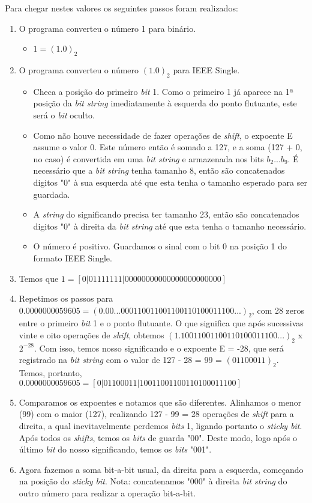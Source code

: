 \documentclass[11pt]{article}
\begin{document}
Para chegar nestes valores os seguintes passos foram realizados:
\begin{enumerate}
  \item O programa converteu o número 1 para binário.
    \begin{itemize}
      \item  $ 1 = (1.0)_2 $
    \end{itemize}
  \item O programa converteu o número $(1.0)_2$ para IEEE Single.
  \begin{itemize}
    \item Checa a posição do primeiro \textit{bit} 1. Como o primeiro 1 já aparece na 1ª posição da \textit{bit string} imediatamente à esquerda do ponto flutuante, este será o \textit{bit} oculto.
    \item Como não houve necessidade de fazer operações de \textit{shift}, o expoente E assume o valor 0. Este número então é somado a 127, e a soma (127 + 0, no caso)
    é convertida em uma \textit{bit string} e armazenada nos bits $b_2 ... b_9$. É necessário que a \textit{bit string} tenha tamanho 8, então são concatenados digitos "0"
    à sua esquerda até que esta tenha o tamanho esperado para ser guardada.
    \item A \textit{string} do significando precisa ter tamanho 23, então são concatenados digitos "0" à direita da \textit{bit string} até que esta tenha
    o tamanho necessário.
    \item O número é positivo. Guardamos o sinal com o bit 0 na posição 1 do formato IEEE Single.
  \end{itemize}
  \item Temos que {\small$1  = [ 0 | 0 1 1 1 1 1 1 1 | 0 0 0 0 0 0 0 0 0 0 0 0 0 0 0 0 0 0 0 0 0 0 0 ] $}
  \item Repetimos os passos para $0.0000000059605 = (0.00...000110011001100110100011100...)_2$, com 28 zeros entre o primeiro \textit{bit} 1 e o ponto flutuante. O que significa que após sucessivas vinte e oito operações
  de \textit{shift}, obtemos $ (1.10011001100110100011100...)_2 $ x $ 2^{-28} $. Com isso, temos nosso significando e o expoente E = -28, que será registrado na \textit{bit string} com o valor de 127 - 28 = 99 = $ (01100011)_2 $.
  Temos, portanto, {\small$0.0000000059605 = [ 0 | 0 1 1 0 0 0 1 1 | 1 0 0 1 1 0 0 1 1 0 0 1 1 0 1 0 0 0 1 1 1 0 0 ] $}
  \item Comparamos os expoentes e notamos que são diferentes. Alinhamos o menor (99) com o maior (127), realizando 127 - 99 = 28 operações de \textit{shift} para a direita, a qual inevitavelmente perdemos \textit{bits} 1, ligando
  portanto o \textit{sticky bit}. Após todos os \textit{shifts}, temos os \textit{bits} de guarda "00". Deste modo, logo após o último \textit{bit} do nosso significando, temos os \textit{bits} "001".
  \item Agora fazemos a soma bit-a-bit usual, da direita para a esquerda, começando na posição do \textit{sticky bit}. Nota: concatenamos "000" à direita \textit{bit string} do outro número para realizar a operação bit-a-bit.


\end{enumerate}
\end{document}
